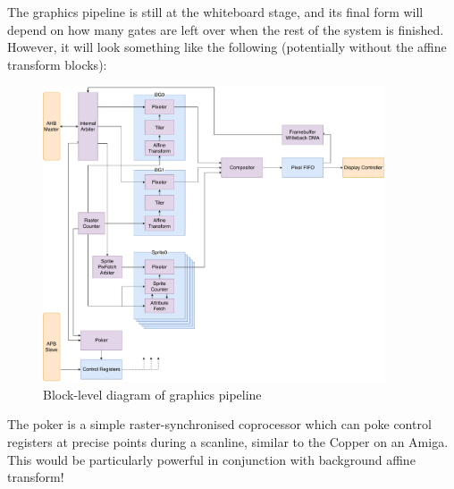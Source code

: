 \documentclass{article}
\begin{document}
The graphics pipeline is still at the whiteboard stage, and its final form will depend on how many gates are left over when the rest of the system is finished. However, it will look something like the following (potentially without the affine transform blocks):

\begin{figure}[!htb]
\centering
\caption{Block-level diagram of graphics pipeline}
\includegraphics[width=0.9\textwidth]{diagrams/graphics.pdf}
\end{figure}

The poker is a simple raster-synchronised coprocessor which can poke control registers at precise points during a scanline, similar to the Copper on an Amiga. This would be particularly powerful in conjunction with background affine transform!
\end{document}
